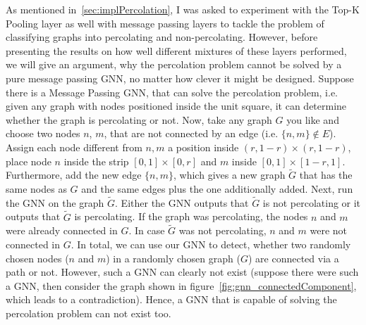 As mentioned in~\ref{sec:implPercolation}, I was asked to experiment with the Top-K Pooling layer as well with message passing layers 
to tackle the problem of classifying graphs into percolating and non-percolating. 
However, before presenting the results on how well different mixtures of these layers performed, we will give an argument, why the percolation problem 
cannot be solved by a pure message passing GNN, no matter how clever it might be designed.
Suppose there is a Message Passing GNN, that can solve the percolation problem, i.e. given any graph 
with nodes positioned inside the unit square, it can determine whether the graph is percolating or not. 
Now, take any graph $G$ you like and choose two nodes $n$, $m$, that are not connected by an edge (i.e. $\{n,m\}\notin E$). 
Assign each node different from $n, m$ a position inside 
$(r, 1-r)\times(r, 1-r)$, place node $n$ inside the strip $[0,1]\times [0,r]$ and $m$ inside $[0,1]\times[1-r, 1]$. 
Furthermore, add the new edge $\{n,m\}$, which gives a new graph $\tilde{G}$ that has the same nodes
as $G$ and the same edges plus the one additionally added. Next, run the GNN on the graph $\tilde{G}$. 
Either the GNN outputs that $\tilde{G}$ is not percolating or it outputs that $\tilde{G}$ is percolating. 
If the graph was percolating, the nodes $n$ and $m$ were already connected in $G$. 
In case $\tilde{G}$ was not percolating, $n$ and $m$ were not connected in $G$. 
In total, we can use our GNN to detect, whether two randomly chosen nodes ($n$ and $m$) in a randomly 
chosen graph ($G$) are connected via a path or not.
However, such a GNN can clearly not exist (suppose there were such a GNN, 
then consider the graph shown in figure~\ref{fig:gnn_connectedComponent}, which leads to
a contradiction).
Hence, a GNN that is capable of solving the percolation problem can not exist too.
